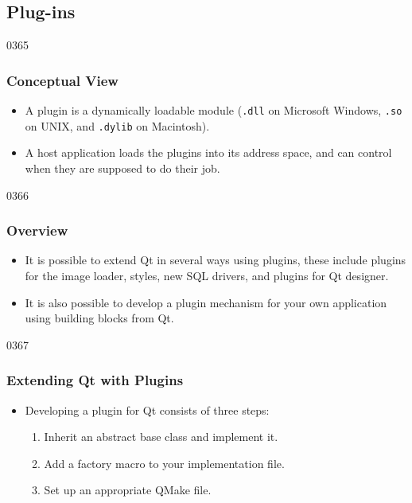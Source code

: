 %
%
%
%

\subsection{Plug-ins}
\label{plugins}


\begin{slide}{0365}\frametitle{Conceptual View}
\begin{itemize}
\item A plugin is a dynamically loadable module (\texttt{.dll} on Microsoft
  Windows, \texttt{.so} on UNIX, and \texttt{.dylib} on Macintosh).
\item A host application loads the plugins into its address space, and can
  control when they are supposed to do their job.
\end{itemize}
\end{slide}


\begin{slide}[fragile]{0366}
\frametitle{Overview}
\begin{itemize}
\item It is possible to extend Qt in several ways using plugins, these
  include plugins for the image loader, styles, new SQL drivers, and
  plugins for Qt designer.
\item It is also possible to develop a plugin mechanism for your
  own application using building blocks from Qt.
\end{itemize}
\end{slide}

\begin{slide}{0367}\frametitle{Extending Qt with Plugins}
\begin{itemize}
\item Developing a plugin for Qt consists of three steps:
  \begin{enumerate}
  \item Inherit an abstract base class and implement it.
  \item Add a factory macro to your implementation file.
  \item Set up an appropriate QMake file.
\end{enumerate}
\end{itemize}
\end{slide}

